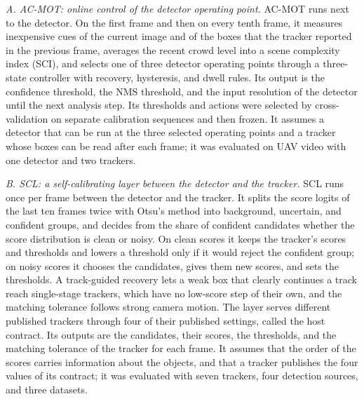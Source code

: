 \emph{A. AC-MOT: online control of the detector operating point.} AC-MOT runs next to the detector. On the first frame and then on every tenth frame, it measures inexpensive cues of the current image and of the boxes that the tracker reported in the previous frame, averages the recent crowd level into a scene complexity index (SCI), and selects one of three detector operating points through a three-state controller with recovery, hysteresis, and dwell rules. Its output is the confidence threshold, the NMS threshold, and the input resolution of the detector until the next analysis step. Its thresholds and actions were selected by cross-validation on separate calibration sequences and then frozen. It assumes a detector that can be run at the three selected operating points and a tracker whose boxes can be read after each frame; it was evaluated on UAV video with one detector and two trackers.

\emph{B. SCL: a self-calibrating layer between the detector and the tracker.} SCL runs once per frame between the detector and the tracker. It splits the score logits of the last ten frames twice with Otsu's method \cite{goh2018otsu} into background, uncertain, and confident groups, and decides from the share of confident candidates whether the score distribution is clean or noisy. On clean scores it keeps the tracker's scores and thresholds and lowers a threshold only if it would reject the confident group; on noisy scores it chooses the candidates, gives them new scores, and sets the thresholds. A track-guided recovery lets a weak box that clearly continues a track reach single-stage trackers, which have no low-score step of their own, and the matching tolerance follows strong camera motion. The layer serves different published trackers through four of their published settings, called the host contract. Its outputs are the candidates, their scores, the thresholds, and the matching tolerance of the tracker for each frame. It assumes that the order of the scores carries information about the objects, and that a tracker publishes the four values of its contract; it was evaluated with seven trackers, four detection sources, and three datasets.

